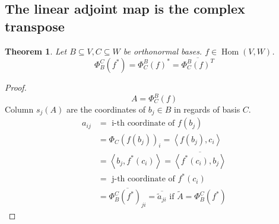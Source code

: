 \documentclass[a4paper]{article}
\newcounter{lecref}[section]
\numberwithin{lecref}{section}
\newtheorem{theorem}[lecref]{Theorem}
\newcommand{\ip}[2]{\left\langle#1,#2\right\rangle} %
\begin{document}
\subsection{The linear adjoint map is the complex transpose}
\begin{theorem} %
  Let $B \subseteq V, C \subseteq W$ be orthonormal bases. $f \in \operatorname{Hom}(V, W)$.
  \[ \Phi_B^C(f^*) = \Phi_C^B(f)^* = \overline{\Phi_C^B(f)^T} \]
\end{theorem}

\begin{proof}
  \[ A = \Phi_C^B(f) \]
  Column $s_j(A)$ are the coordinates of $b_j \in B$ in regards of basis $C$.
  \begin{align*}
    a_{ij} &= \text{ i-th coordinate of } f(b_j) \\
      &= \Phi_C(f(b_j))_i = \ip{f(b_j)}{c_i} \\
      &= \ip{b_j}{f^*(c_i)} = \overline{\ip{f^*(c_i)}{b_j}} \\
      &= \text{ j-th coordinate of } f^*(c_i) \\
      &= \overline{\Phi_B^C(f^*)_{ji}} = \overline{\tilde{a}_{ji}} \text{ if } \tilde A = \Phi_B^C(f^*)
  \end{align*}
\end{proof}
\end{document}
